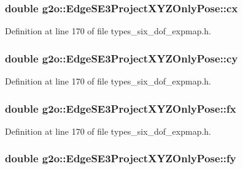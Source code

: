 \subsubsection[{\texorpdfstring{cx}{cx}}]{\setlength{\rightskip}{0pt plus 5cm}double g2o\+::\+Edge\+S\+E3\+Project\+X\+Y\+Z\+Only\+Pose\+::cx}\hypertarget{classg2o_1_1EdgeSE3ProjectXYZOnlyPose_ab4d7078a2d9a628afd6022c983843904}{}\label{classg2o_1_1EdgeSE3ProjectXYZOnlyPose_ab4d7078a2d9a628afd6022c983843904}


Definition at line 170 of file types\+\_\+six\+\_\+dof\+\_\+expmap.\+h.

\subsubsection[{\texorpdfstring{cy}{cy}}]{\setlength{\rightskip}{0pt plus 5cm}double g2o\+::\+Edge\+S\+E3\+Project\+X\+Y\+Z\+Only\+Pose\+::cy}\hypertarget{classg2o_1_1EdgeSE3ProjectXYZOnlyPose_aa6f6f24382d0f9b03d6ae47747e6d95d}{}\label{classg2o_1_1EdgeSE3ProjectXYZOnlyPose_aa6f6f24382d0f9b03d6ae47747e6d95d}


Definition at line 170 of file types\+\_\+six\+\_\+dof\+\_\+expmap.\+h.

\subsubsection[{\texorpdfstring{fx}{fx}}]{\setlength{\rightskip}{0pt plus 5cm}double g2o\+::\+Edge\+S\+E3\+Project\+X\+Y\+Z\+Only\+Pose\+::fx}\hypertarget{classg2o_1_1EdgeSE3ProjectXYZOnlyPose_a413ca1179697e29d5476f582d2b29ff6}{}\label{classg2o_1_1EdgeSE3ProjectXYZOnlyPose_a413ca1179697e29d5476f582d2b29ff6}


Definition at line 170 of file types\+\_\+six\+\_\+dof\+\_\+expmap.\+h.

\subsubsection[{\texorpdfstring{fy}{fy}}]{\setlength{\rightskip}{0pt plus 5cm}double g2o\+::\+Edge\+S\+E3\+Project\+X\+Y\+Z\+Only\+Pose\+::fy}\hypertarget{classg2o_1_1EdgeSE3ProjectXYZOnlyPose_a2f645f770962dc9d8c4862c0c6dbb497}{}\label{classg2o_1_1EdgeSE3ProjectXYZOnlyPose_a2f645f770962dc9d8c4862c0c6dbb497}


